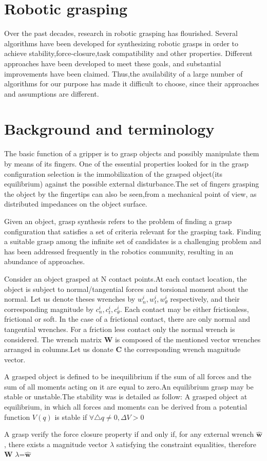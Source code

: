 \section{Robotic grasping}
Over the past decades, research in robotic grasping has flourished. Several algorithms have been developed for synthesizing robotic grasps in order to achieve stability,force-closure,task compatibility and other properties. Different approaches have been developed to meet these goals, and substantial improvements have been claimed. Thus,the availability of a large number of algorithms
for our purpose has made it difficult to choose, since their approaches and assumptions are different.
\section{Background and terminology}
The basic function of a gripper is to grasp objects and possibly
manipulate them by means of its fingers. One of the essential
properties looked for in the grasp configuration selection is the
immobilization of the grasped object(its equilibrium) against the
possible external disturbance.The set of fingers grasping the object
by the fingertips can also be seen,from a mechanical point of view,
as distributed impedances on the object surface.
\par
Given an object, grasp synthesis refers to the problem of
finding a grasp configuration that satisfies a set of criteria
relevant for the grasping task. Finding a suitable grasp among
the infinite set of candidates is a challenging problem and has
been addressed frequently in the robotics community, resulting
in an abundance of approaches.
\par
Consider an object grasped at N contact points.At each contact
location, the object is subject to normal/tangential forces and
torsional moment about the normal. Let us denote theses wrenches by
$w_{n}^{i},w_{t}^{i},w_{\theta}^{i}$ respectively, and their corresponding magnitude
by $c_{n}^{i},c_{t}^{i},c_{\theta}^{i}$. Each contact may be either frictionless, frictional
or soft. In the case of a frictional contact, there are only normal
and tangential wrenches. For a friction less contact only the normal
wrench is considered. The wrench matrix \textbf{W}  is composed of the
mentioned vector wrenches arranged in columns.Let us donate 
\textbf{C} the corresponding wrench magnitude vector.
\par
A grasped object is defined to be inequilibrium if the sum of all forces and the sum of all moments acting on it are equal to zero.An equilibrium grasp may be stable or unstable.The stability was is detailed as follow: A grasped object at
equilibrium, in which all forces and moments can be derived from a potential function $ V(q) $ is stable if $ \forall\bigtriangleup q\neq0, \Delta V>0 $
\par
A grasp verify the force closure property if and only if, for any external wrench
\textbf{$\widehat{\textbf{w}}$}, there exists a magnitude vector $\lambda$ satisfying the constraint equalities, therefore \textbf{W} $\lambda$=\textbf{$\widehat{\textbf{w}}$}

